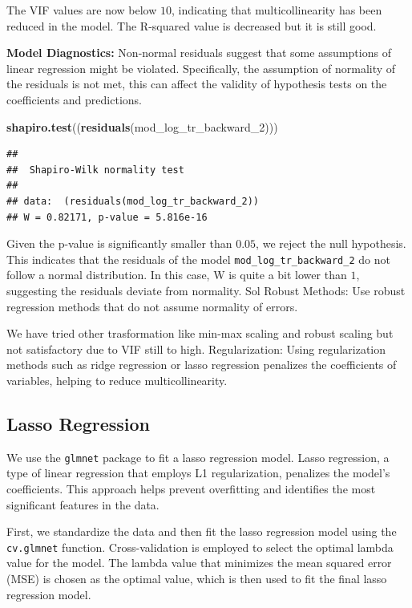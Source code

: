 \documentclass[
]{article}
\newenvironment{Shaded}{\begin{snugshade}}{\end{snugshade}}
\newcommand{\FunctionTok}[1]{\textcolor[rgb]{0.13,0.29,0.53}{\textbf{#1}}}
\newcommand{\NormalTok}[1]{#1}
\begin{document}
The VIF values are now below \(10\), indicating that multicollinearity
has been reduced in the model. The R-squared value is decreased but it
is still good.

\textbf{Model Diagnostics:} Non-normal residuals suggest that some
assumptions of linear regression might be violated. Specifically, the
assumption of normality of the residuals is not met, this can affect the
validity of hypothesis tests on the coefficients and predictions.

\begin{Shaded}
\begin{Highlighting}[]
\FunctionTok{shapiro.test}\NormalTok{((}\FunctionTok{residuals}\NormalTok{(mod\_log\_tr\_backward\_2)))}
\end{Highlighting}
\end{Shaded}

\begin{verbatim}
## 
##  Shapiro-Wilk normality test
## 
## data:  (residuals(mod_log_tr_backward_2))
## W = 0.82171, p-value = 5.816e-16
\end{verbatim}

Given the p-value is significantly smaller than \(0.05\), we reject the
null hypothesis. This indicates that the residuals of the model
\texttt{mod\_log\_tr\_backward\_2} do not follow a normal distribution.
In this case, W is quite a bit lower than \(1\), suggesting the
residuals deviate from normality. Sol Robust Methods: Use robust
regression methods that do not assume normality of errors.

We have tried other trasformation like min-max scaling and robust
scaling but not satisfactory due to VIF still to high. Regularization:
Using regularization methods such as ridge regression or lasso
regression penalizes the coefficients of variables, helping to reduce
multicollinearity.

\subsection{Lasso Regression}\label{lasso-regression}

We use the \texttt{glmnet} package to fit a lasso regression model.
Lasso regression, a type of linear regression that employs L1
regularization, penalizes the model's coefficients. This approach helps
prevent overfitting and identifies the most significant features in the
data.

First, we standardize the data and then fit the lasso regression model
using the \texttt{cv.glmnet} function. Cross-validation is employed to
select the optimal lambda value for the model. The lambda value that
minimizes the mean squared error (MSE) is chosen as the optimal value,
which is then used to fit the final lasso regression model.
\end{document}
